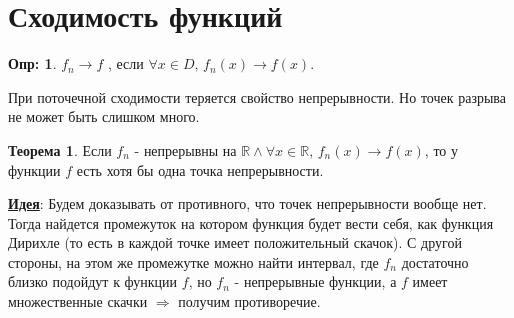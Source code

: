 \documentclass[12pt]{article}
\newcommand{\MR}{\mathbb{R}}
\theoremstyle{definition}
\newtheorem{defn}{Опр:}
\newtheorem{theorem}{Теорема}
\begin{document}

\section*{Сходимость функций}
\begin{defn}
	$f_n \to f$ , если $\forall x \in D, \, f_n(x) \to f(x)$.
\end{defn}

При поточечной сходимости теряется свойство непрерывности. Но точек разрыва не может быть слишком много.

\begin{theorem}
	Если $f_n$ - непрерывны на $\MR \wedge \forall x\in \MR, \, f_n(x) \to f(x)$, то у функции $f$ есть хотя бы одна точка непрерывности.
\end{theorem}

\uline{\textbf{Идея}}: Будем доказывать от противного, что точек непрерывности вообще нет. Тогда найдется промежуток на котором функция будет вести себя, как функция Дирихле (то есть в каждой точке имеет положительный скачок). С другой стороны, на этом же промежутке можно найти интервал, где $f_n$ достаточно близко подойдут к функции $f$, но $f_n$ - непрерывные функции, а $f$ имеет множественные скачки $\Rightarrow$ получим противоречие.
\end{document}
